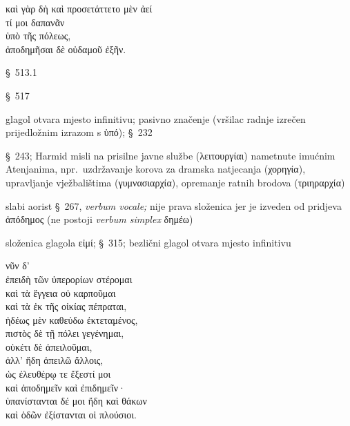 {\large
\begin{greek}
καὶ γὰρ δὴ καὶ προσετάττετο μὲν ἀεί \\
\tabto{2em} τί μοι δαπανᾶν \\
\tabto{2em} ὑπὸ τῆς πόλεως, \\
ἀποδημῆσαι δὲ οὐδαμοῦ ἐξῆν.\\

\end{greek}
}

\begin{description}[noitemsep]
\item[καὶ\dots\ δὴ καὶ\dots] §~513.1
\item[γὰρ] §~517
\item[προσετάττετο] glagol otvara mjesto infinitivu; pasivno značenje (vršilac radnje izrečen prijedložnim izrazom s ὑπό); §~232
\item[δαπανᾶν] §~243; Harmid misli na prisilne javne službe (λειτουργίαι) nametnute imućnim Atenjanima, npr.\ uzdržavanje korova za dramska natjecanja (χορηγία), upravljanje vježbalištima (γυμνασιαρχία), opremanje ratnih brodova (τριηραρχία)
\item[ἀποδημῆσαι] slabi aorist §~267, \textit{verbum vocale;} nije prava složenica jer je izveden od pridjeva ἀπόδημος (ne postoji \textit{verbum simplex} δημέω)
\item[ἐξῆν] složenica glagola εἰμί; §~315; bezlični glagol otvara mjesto infinitivu
\end{description}


{\large
\begin{greek}
\noindent νῦν δ' \\
ἐπειδὴ τῶν ὑπερορίων στέρομαι \\
\tabto{2em} καὶ τὰ ἔγγεια οὐ καρποῦμαι \\
\tabto{2em} καὶ τὰ ἐκ τῆς οἰκίας πέπραται, \\
ἡδέως μὲν καθεύδω ἐκτεταμένος, \\
πιστὸς δὲ τῇ πόλει γεγένημαι, \\
οὐκέτι δὲ ἀπειλοῦμαι, \\
ἀλλ' ἤδη ἀπειλῶ ἄλλοις, \\
ὡς ἐλευθέρῳ τε ἔξεστί μοι \\
\tabto{2em} καὶ ἀποδημεῖν καὶ ἐπιδημεῖν· \\
ὑπανίστανται δέ μοι ἤδη καὶ θάκων \\
καὶ ὁδῶν ἐξίστανται οἱ πλούσιοι.\\

\end{greek}
}

